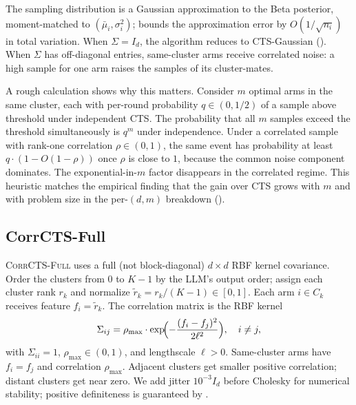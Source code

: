 \documentclass{article}
\theoremstyle{plain}
\theoremstyle{definition}
\theoremstyle{remark}
\newcommand{\CorrFull}{\textsc{CorrCTS-Full}}
\begin{document}
The sampling distribution is a Gaussian approximation to the Beta posterior, moment-matched to $(\bar\mu_i, \sigma_i^2)$;  bounds the approximation error by $O(1/\sqrt{n_i})$ in total variation.
When $\Sigma = I_d$, the algorithm reduces to CTS-Gaussian ().
When $\Sigma$ has off-diagonal entries, same-cluster arms receive correlated noise: a high sample for one arm raises the samples of its cluster-mates.

A rough calculation shows why this matters.
Consider $m$ optimal arms in the same cluster, each with per-round probability $q \in (0, 1/2)$ of a sample above threshold under independent CTS.
The probability that all $m$ samples exceed the threshold simultaneously is $q^m$ under independence.
Under a correlated sample with rank-one correlation $\rho \in (0,1)$, the same event has probability at least $q \cdot (1 - O(1 - \rho))$ once $\rho$ is close to $1$, because the common noise component dominates.
The exponential-in-$m$ factor disappears in the correlated regime.
This heuristic matches the empirical finding that the gain over CTS grows with $m$ and with problem size in the per-$(d,m)$ breakdown ().

\subsection{CorrCTS-Full}\label{sec:n1}

\CorrFull{} uses a full (not block-diagonal) $d \times d$ RBF kernel covariance.
Order the clusters from $0$ to $K-1$ by the LLM's output order; assign each cluster rank $r_k$ and normalize $\tilde{r}_k = r_k / (K-1) \in [0,1]$.
Each arm $i \in C_k$ receives feature $f_i = \tilde{r}_k$.
The correlation matrix is the RBF kernel
\begin{equation}\label{eq:rbf}
  \Sigma_{ij} = \rho_{\max} \cdot \exp\!\Bigl(-\frac{(f_i - f_j)^2}{2\ell^2}\Bigr), \quad i \neq j,
\end{equation}
with $\Sigma_{ii} = 1$, $\rho_{\max} \in (0,1)$, and lengthscale $\ell > 0$.
Same-cluster arms have $f_i = f_j$ and correlation $\rho_{\max}$.
Adjacent clusters get smaller positive correlation; distant clusters get near zero.
We add jitter $10^{-3} I_d$ before Cholesky for numerical stability; positive definiteness is guaranteed by .
\end{document}

